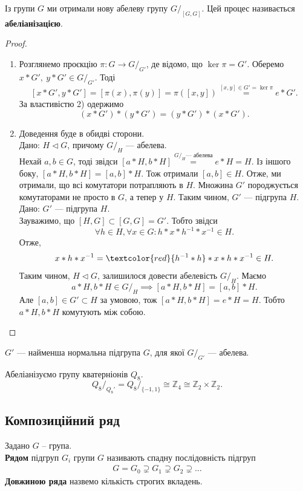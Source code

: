 \documentclass{math_library}
\begin{document}
\begin{remark}
Із групи $G$ ми отримали нову абелеву групу $G/_{[G,G]}$. Цей процес називається \textbf{абеліанізацією}.
\end{remark}

\begin{proof}
\begin{enumerate}[topsep=0pt,wide=0pt,label={\arabic*)}]
\item Розглянемо проєкцію $\pi \colon G \to G/_{G'}$, де відомо, що $\ker \pi = G'$. Оберемо $x*G',\ y*G' \in G/_{G'}$. Тоді
\[
[x*G',y*G'] = [\pi(x), \pi(y)] = \pi([x,y]) \overset{[x,y] \in G' = \ker \pi}{=} e*G'.
\]
За властивістю 2) одержимо
\[
(x*G')*(y*G') = (y*G')*(x*G').
\]

\item Доведення буде в обидві сторони.\\
\rightproof Дано: $H \triangleleft G$, причому $G/_H$ --- абелева.\\
Нехай $a,b \in G$, тоді звідси $[a*H,b*H] \overset{G/_H \text{--- абелева}}{=} e*H = H$. Із іншого боку, $[a*H,b*H] = [a,b]*H$. Тож отримали $[a,b] \in H$. Отже, ми отримали, що всі комутатори потрапляють в $H$. Множина $G'$ породжується комутаторами не просто в $G$, а тепер у $H$. Таким чином, $G'$ --- підгрупа $H$.
\bigskip \\
\leftproof Дано: $G'$ --- підгрупа $H$.\\
Зауважимо, що $[H,G] \subset [G,G] = G'$. Тобто звідси 
\[
\forall h \in H, \forall x \in G: h*x*h^{-1}*x^{-1} \in H.
\]
Отже, 
\[
x*h*x^{-1} = \textcolor{red}{h^{-1}*h}*x*h*x^{-1} \in H.
\]
Таким чином, $H \triangleleft G$, залишилося довести абелевість $G/_H$. Маємо 
\[
a*H,b*H \in G/_H \implies [a*H,b*H] = [a,b]*H.
\]
Але $[a,b] \in G' \subset H$ за умовою, тож $[a*H,b*H] = e*H = H$. Тобто $a*H,b*H$ комутують між собою. \qedhere
\end{enumerate}
\end{proof}

\begin{corollary}
$G'$ --- найменша нормальна підгрупа $G$, для якої $G/_{G'}$ --- абелева.
\end{corollary}

\begin{example}
Абеліанізуємо групу кватерніонів $Q_8$.
\[
{Q_8}/_{Q_8'} = {Q_8}/_{\{-1,1\}} \cong \mathbb{Z}_4 \cong \mathbb{Z}_2 \times \mathbb{Z}_2.
\]
\end{example}

\subsection{Композиційний ряд}
\begin{definition}
Задано $G$ -- група.\\
\textbf{Рядом} підгруп $G_i$ групи $G$ називають спадну послідовність підгруп
\begin{align*}
G = G_0 \supsetneq G_1 \supsetneq G_2 \supsetneq \dots
\end{align*}
\textbf{Довжиною ряда} назвемо кількість строгих вкладень.
\end{definition}
\end{document}
